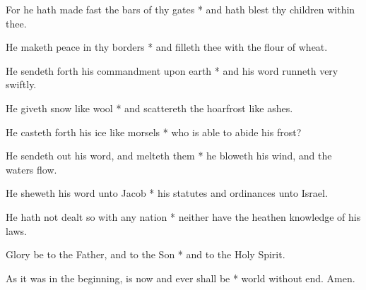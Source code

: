 \begin{multicols}{2}
	For he hath made fast the bars of thy gates * and hath blest thy children within thee.
	
	He maketh peace in thy borders * and filleth thee with the flour of wheat.
	
	He sendeth forth his commandment upon earth * and his word runneth very swiftly.
	
	He giveth snow like wool * and scattereth the hoarfrost like ashes.
	
	He casteth forth his ice like morsels * who is able to abide his frost?
	
	He sendeth out his word, and melteth them * he bloweth his wind, and the waters flow.
	
	He sheweth his word unto Jacob * his statutes and ordinances unto Israel.
	
	He hath not dealt so with any nation * neither have the heathen knowledge of his laws.
	
	Glory be to the Father, and to the Son * and to the Holy Spirit.
	
	As it was in the beginning, is now and ever shall be * world without end. Amen.
\end{multicols}